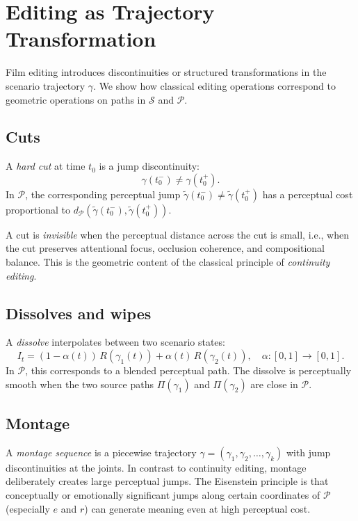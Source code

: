 \documentclass[12pt,a4paper]{article}
\theoremstyle{plain}
\theoremstyle{definition}
\begin{document}
\section{Editing as Trajectory Transformation}
\label{sec:editing}

Film editing introduces discontinuities or structured transformations in the
scenario trajectory $\gamma$. We show how classical editing operations correspond
to geometric operations on paths in $\mathcal{S}$ and $\mathcal{P}$.

\subsection{Cuts}

A \emph{hard cut} at time $t_0$ is a jump discontinuity:
\[
\gamma(t_0^-) \neq \gamma(t_0^+).
\]
In $\mathcal{P}$, the corresponding perceptual jump $\tilde\gamma(t_0^-)
\neq \tilde\gamma(t_0^+)$ has a perceptual cost proportional to
$d_\mathcal{P}(\tilde\gamma(t_0^-), \tilde\gamma(t_0^+))$.

A cut is \emph{invisible} when the perceptual distance across the cut is small,
i.e., when the cut preserves attentional focus, occlusion coherence, and
compositional balance. This is the geometric content of the classical principle
of \emph{continuity editing}.

\subsection{Dissolves and wipes}

A \emph{dissolve} interpolates between two scenario states:
\[
I_t = (1-\alpha(t))\,R(\gamma_1(t)) + \alpha(t)\,R(\gamma_2(t)),
\quad \alpha:[0,1]\to[0,1].
\]
In $\mathcal{P}$, this corresponds to a blended perceptual path. The dissolve
is perceptually smooth when the two source paths $\Pi(\gamma_1)$ and
$\Pi(\gamma_2)$ are close in $\mathcal{P}$.

\subsection{Montage}

A \emph{montage sequence} is a piecewise trajectory
$\gamma = (\gamma_1,\gamma_2,\dots,\gamma_k)$
with jump discontinuities at the joints. In contrast to continuity editing,
montage deliberately creates large perceptual jumps. The Eisenstein principle
is that conceptually or emotionally significant jumps along certain coordinates
of $\mathcal{P}$ (especially $e$ and $r$) can generate meaning even at high
perceptual cost.
\end{document}
